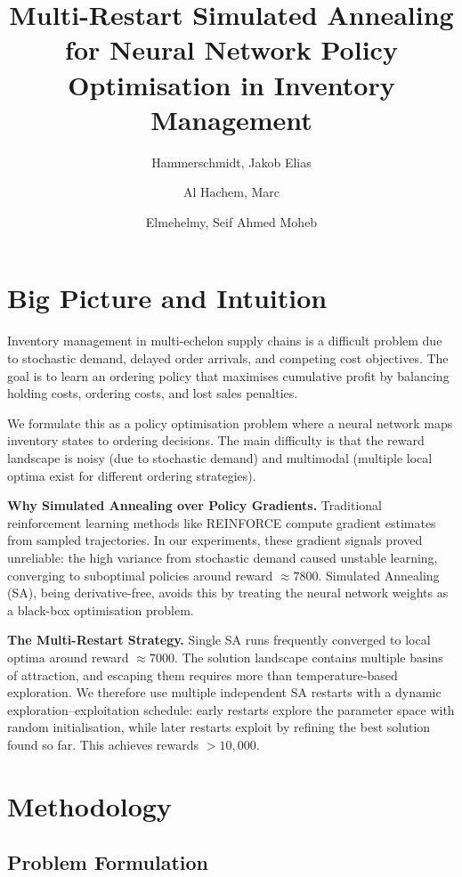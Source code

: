 \documentclass[11pt,a4paper]{article}
\title{\vspace{-1cm}\textbf{Multi-Restart Simulated Annealing for Neural Network Policy Optimisation in Inventory Management}\vspace{-0.25cm}}
\author{Hammerschmidt, Jakob Elias \and Al Hachem, Marc \and Elmehelmy, Seif Ahmed Moheb}
\date{}
\begin{document}
\maketitle

\section{Big Picture and Intuition}

Inventory management in multi-echelon supply chains is a difficult problem due to stochastic demand, delayed order arrivals, and competing cost objectives. The goal is to learn an ordering policy that maximises cumulative profit by balancing holding costs, ordering costs, and lost sales penalties.

We formulate this as a policy optimisation problem where a neural network maps inventory states to ordering decisions. The main difficulty is that the reward landscape is noisy (due to stochastic demand) and multimodal (multiple local optima exist for different ordering strategies).

\textbf{Why Simulated Annealing over Policy Gradients.}
Traditional reinforcement learning methods like REINFORCE compute gradient estimates from sampled trajectories. In our experiments, these gradient signals proved unreliable: the high variance from stochastic demand caused unstable learning, converging to suboptimal policies around reward $\approx 7800$. Simulated Annealing (SA), being derivative-free, avoids this by treating the neural network weights as a black-box optimisation problem.

\textbf{The Multi-Restart Strategy.}
Single SA runs frequently converged to local optima around reward $\approx 7000$. The solution landscape contains multiple basins of attraction, and escaping them requires more than temperature-based exploration. We therefore use multiple independent SA restarts with a dynamic exploration--exploitation schedule: early restarts explore the parameter space with random initialisation, while later restarts exploit by refining the best solution found so far. This achieves rewards $>10{,}000$.

\section{Methodology}
\subsection{Problem Formulation}
\end{document}

